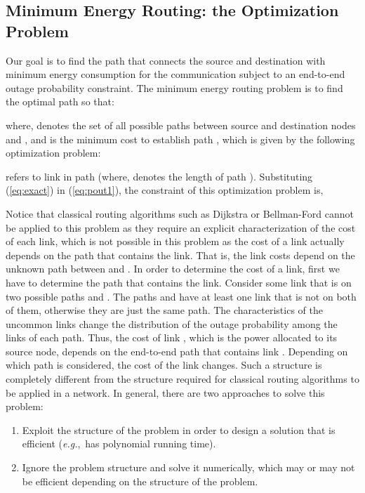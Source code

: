 \documentclass[10pt,journal]{IEEEtran}
\theoremstyle{definition}
\newcommand{\eg}{\textit{e.g.},}
\begin{document}
\subsection{Minimum Energy Routing: the Optimization Problem}
Our goal is to find the  path that connects the source and destination  with minimum energy consumption for the communication subject to an
end-to-end outage probability constraint. 
The minimum energy routing problem is to find the optimal path  so that:

where,  denotes the set of all possible paths between source and destination nodes  and , and  is the minimum cost to establish path , which is given by the following optimization problem:

 refers to link  in path  (where,  denotes the length of path ). Substituting (\ref{eq:exact})  in (\ref{eq:pout1}), the constraint of this optimization problem is,

{Notice that classical routing algorithms such as Dijkstra or Bellman-Ford cannot be applied to this problem  as they require an explicit characterization of the cost of each link, which is not possible in this problem as the cost of a link actually depends on the path that contains the link. 
That is, the link costs depend on the unknown path between  and . In order to determine the cost of a link, first we have to determine the path that contains the link. 
Consider some link  that is on two possible paths  and . 
The paths  and  have at least one link that is not on both of them, otherwise they are just the same path. 
The characteristics of the uncommon links change the distribution of the outage probability among the links of each path. 
Thus, the cost of link , which is the power allocated to its source node, depends on the end-to-end path that contains link . Depending on which path is considered, the cost of the link changes. Such a structure is completely different from the structure required for classical routing algorithms to be applied in a network.
In general, there are two approaches to solve this problem:
\begin{enumerate}
	\item Exploit the structure of the problem in order to design a solution that is efficient (\eg\ has polynomial running time).
	\item Ignore the problem structure and solve it numerically, which may or may not be efficient depending on the structure of the problem.
\end{enumerate}}
\end{document}
